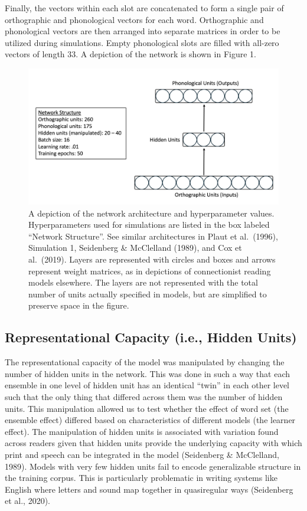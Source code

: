\documentclass[
  ,man,floatsintext]{apa6}
\begin{document}
Finally, the vectors within each slot are concatenated to form a single pair of orthographic and phonological vectors for each word. Orthographic and phonological vectors are then arranged into separate matrices in order to be utilized during simulations. Empty phonological slots are filled with all-zero vectors of length 33. A depiction of the network is shown in Figure 1.

\begin{figure}
\centering
\includegraphics{img/figure_1.jpg}
\caption{\label{fig:figure1}A depiction of the network architecture and hyperparameter values. Hyperparameters used for simulations are listed in the box labeled ``Network Structure''. See similar architectures in Plaut et al.~(1996), Simulation 1, Seidenberg \& McClelland (1989), and Cox et al.~(2019). Layers are represented with circles and boxes and arrows represent weight matrices, as in depictions of connectionist reading models elsewhere. The layers are not represented with the total number of units actually specified in models, but are simplified to preserve space in the figure.}
\end{figure}

\subsection{Representational Capacity (i.e., Hidden Units)}\label{representational-capacity-i.e.-hidden-units}

The representational capacity of the model was manipulated by changing the number of hidden units in the network. This was done in such a way that each ensemble in one level of hidden unit has an identical ``twin'' in each other level such that the only thing that differed across them was the number of hidden units. This manipulation allowed us to test whether the effect of word set (the ensemble effect) differed based on characteristics of different models (the learner effect). The manipulation of hidden units is associated with variation found across readers given that hidden units provide the underlying capacity with which print and speech can be integrated in the model (Seidenberg \& McClelland, 1989). Models with very few hidden units fail to encode generalizable structure in the training corpus. This is particularly problematic in writing systems like English where letters and sound map together in quasiregular ways (Seidenberg et al., 2020).
\end{document}
